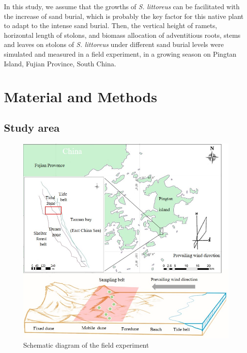 \documentclass[]{interact}
\theoremstyle{plain}%
\theoremstyle{definition}
\theoremstyle{remark}
\begin{document}
\label{Introduction-5}
In this study, we assume that the growths of \textit{S. littoreus} can be facilitated with the increase of sand burial, which is probably the key factor for this native plant to adapt to the intense sand burial. Then, the vertical height of ramets, horizontal length of stolons, and biomass allocation of adventitious roots, stems and leaves on stolons of \textit{S. littoreus} under different sand burial levels were simulated and measured in a field experiment, in a growing season on Pingtan Island, Fujian Province, South China.


\section{Material and Methods}
\subsection{Study area}

\begin{figure}
  \centering
  \includegraphics[scale=0.8]{../figs/study_area.jpg}
  \caption{Schematic diagram of the field experiment} 
  \label{fig:map}
\end{figure}
\end{document}
